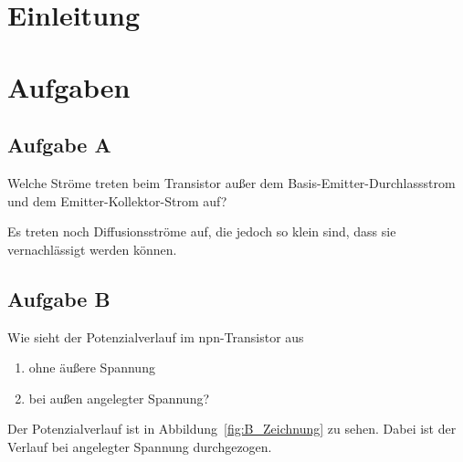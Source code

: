 \tableofcontents

\listoftodo
\newpage


\FloatBarrier
\section{Einleitung}

\fehlt


\FloatBarrier
\section{Aufgaben}

\FloatBarrier
\subsection{Aufgabe A}

\begin{problem}
	Welche Ströme treten beim Transistor außer dem Basis-Emitter-Durchlassstrom
	und dem Emitter-Kollektor-Strom auf?
\end{problem}

Es treten noch Diffusionsströme auf, die jedoch so klein sind, dass sie
vernachlässigt werden können.

\FloatBarrier
\subsection{Aufgabe B}

\begin{problem}
	Wie sieht der Potenzialverlauf im npn-Transistor aus
	\begin{enumerate}
		\item
			ohne äußere Spannung
		\item
			bei außen angelegter Spannung?
	\end{enumerate}
\end{problem}

Der Potenzialverlauf ist in Abbildung~\ref{fig:B_Zeichnung} zu sehen. Dabei ist
der Verlauf bei angelegter Spannung durchgezogen.


